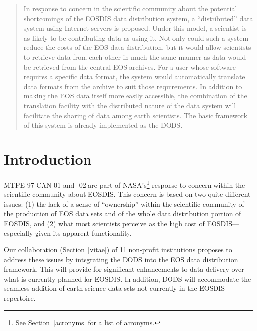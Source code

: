 \documentclass[12pt]{article}
\begin{document}
\baselineskip 12pt

\def\today{\ifcase\month\or January\or February\or March\or April\or 
  May\or June\or July\or August\or September\or October\or November\or 
  December\fi \space\number\day, \number\year}

\tableofcontents
\clearpage

\setcounter{page}{1}

\begin{abstract}
In response to concern in the scientific community about the potential
shortcomings of the \acs{EOSDIS} data distribution system, a 
``distributed'' data system using Internet servers is proposed. Under 
this model, a scientist is as likely to be contributing data as using 
it. Not only could such a system reduce the costs of the \acs{EOS} 
data distribution, but it would allow scientists to retrieve data 
from each other in much the same manner as data would be retrieved 
from the central \acs{EOS} archives. For a user whose software requires 
a specific data format, the system would automatically translate data 
formats from the archive to suit those requirements. In addition to 
making the \acs{EOS} data itself more easily accessible, the 
combination of the translation facility with the distributed nature 
of the data system will facilitate the sharing of data among earth 
scientists. The basic framework of this system is already implemented 
as the \acl{DODS}.
\end{abstract}

\section{Introduction}\label{introduction}

MTPE-97-CAN-01 and -02 are part of \acs{NASA}'s\footnote{See 
Section~\ref{acronyms} for a list of acronyms.} response to concern 
within the scientific community about \acs{EOSDIS}. This concern is 
based on two quite different issues: (1) the lack of a sense of 
``ownership'' within the scientific community of the production of 
\acs{EOS} data sets and of the whole data distribution portion of 
\acs{EOSDIS}, and (2) what most scientists perceive as the high cost 
of \acs{EOSDIS}---especially given its apparent functionality.

Our collaboration (Section~\ref{vitae}) of 11 non-profit institutions
proposes to address these issues by integrating the \ac{DODS} into
the \acs{EOS} data distribution framework. This will provide for
significant enhancements to data delivery over what is currently
planned for \acs{EOSDIS}. In addition, \ac{DODS} will accommodate the
seamless addition of earth science data sets not currently in the
\acs{EOSDIS} repertoire.
\end{document}
